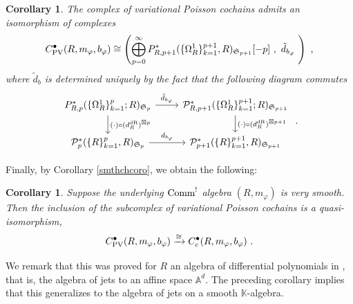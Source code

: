 \documentclass[11pt]{amsart}
\numberwithin{equation}{section}
\newtheorem{prop}[theo]{Proposition}
\newtheorem{coro}[theo]{Corollary}
\theoremstyle{definition}
\newcommand{\bb}{\mathbb}
\newcommand{\mc}{\mathcal}
\newcommand{\mf}{\mathfrak}
\DeclareMathOperator{\Hom}{Hom}
\newcommand{\Mod}{{\textup{-Mod}}}
\newcommand{\K}{{\bb K}}
\newcommand{\ik}{{\bb K}}
\newcommand{\dR}{{\textup{dR}}}
\newcommand{\Comm}{{\textup{Comm}}}
\newcommand{\Lie}{{\textup{Lie}}}
\newcommand{\ch}{{\textup{ch}}}
\newcommand{\Ss}{{{\mf{S}}}}
\newcommand{\PV}{{{\textup{PV}}}}
\newcommand{\0}{{\textbf{0}}}
\newcommand{\DD}{{D}}
\newcommand{\del}{{{\partial}}}
\def\IA{\mathbb{A}}
\def\IG{\mathbb{G}}
\def\OO{{\mc O}}
\def\PP{{\mc P}}
\def\QQ{{\mc Q}}
\def\ch{{\rm ch}}
\def\gf{\mathfrak{g}}
\def \mf{\mathfrak}
\begin{document}
\begin{coro}\label{gPCchcoro} The complex of variational Poisson cochains admits an isomorphism of complexes
	\[ 
	C^\bullet_\PV(R,m_\varphi,b_\varphi) \cong \left( \bigoplus_{p=0}^\infty P^*_{R,p+1}(\{\Omega^1_R\}_{k=1}^{p+1},R)_{\Ss_{p+1}}[-p] \ , \ \tilde d_{b_\varphi} \ \right) \ ,  
	\]
		where $\tilde d_{b}$ is determined uniquely by the fact that the following diagram commutes
	\begin{equation}\label{tildedbeqn}
		\begin{tikzcd}
			 P^*_{R,p}(\{\Omega^1_R \}_{k=1}^{p};R)_{\Ss_{p}} \arrow[r,"\tilde d_{b_\varphi}"] \arrow[d," (\cdot)\circ (d_R^{\dR})^{\boxtimes p}"] & \mc P^*_{R,p+1}(\{\Omega^1_R \}_{k=1}^{p+1};R)_{\Ss_{p+1}}  \arrow[d," (\cdot)\circ (d_R^{\dR})^{\boxtimes p+1}"]\\
			\mc P^*_p(\{R\}_{k=1}^p,R)_{\Ss_{p}} \arrow[r,"d_{b_\varphi}"]&  	\mc P^*_{p+1}(\{R\}_{k=1}^{p+1},R)_{\Ss_{p+1}} 	\end{tikzcd}  \ .
	\end{equation}
\end{coro}

Finally, by Corollary \ref{smthchcoro}, we obtain the following:

\begin{coro}\label{GOequivchcoro} Suppose the underlying $\Comm^!$ algebra $(R,m_\varphi)$ is very smooth. Then the inclusion of the subcomplex of variational Poisson cochains is a quasi-isomorphism,
	\[C^\bullet_\PV(R,m_\varphi,b_\varphi) \xrightarrow{\cong} C_c^\bullet(R,m_\varphi,b_\varphi) \ .\]
\end{coro}

We remark that this was proved for $R$ an algebra of differential polynomials in \cite{BDHKV21}, that is, the algebra of jets to an affine space $\bb A^{d}$. The preceding corollary implies that this generalizes to the algebra of jets on a smooth $\K$-algebra.


%
%
%
%
%
%
\end{document}
